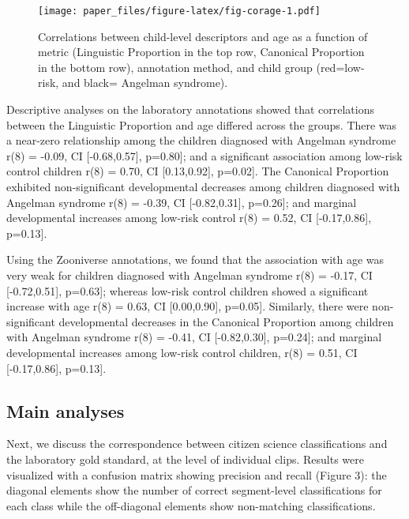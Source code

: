 \documentclass[english,,man]{apa6}
\begin{document}
\begin{figure}
\centering
\texttt{[image: paper\_files/figure-latex/fig-corage-1.pdf]}
\caption{\label{fig:fig-corage}Correlations between child-level descriptors and age as a function of metric (Linguistic Proportion in the top row, Canonical Proportion in the bottom row), annotation method, and child group (red=low-risk, and black= Angelman syndrome).}
\end{figure}

Descriptive analyses on the laboratory annotations showed that correlations between the Linguistic Proportion and age differed across the groups. There was a near-zero relationship among the children diagnosed with Angelman syndrome r(8) = -0.09, CI {[}-0.68,0.57{]}, p=0.80{]}; and a significant association among low-risk control children r(8) = 0.70, CI {[}0.13,0.92{]}, p=0.02{]}. The Canonical Proportion exhibited non-significant developmental decreases among children diagnosed with Angelman syndrome r(8) = -0.39, CI {[}-0.82,0.31{]}, p=0.26{]}; and marginal developmental increases among low-risk control r(8) = 0.52, CI {[}-0.17,0.86{]}, p=0.13{]}.

Using the Zooniverse annotations, we found that the association with age was very weak for children diagnosed with Angelman syndrome r(8) = -0.17, CI {[}-0.72,0.51{]}, p=0.63{]}; whereas low-risk control children showed a significant increase with age r(8) = 0.63, CI {[}0.00,0.90{]}, p=0.05{]}. Similarly, there were non-significant developmental decreases in the Canonical Proportion among children with Angelman syndrome r(8) = -0.41, CI {[}-0.82,0.30{]}, p=0.24{]}; and marginal developmental increases among low-risk control children, r(8) = 0.51, CI {[}-0.17,0.86{]}, p=0.13{]}.

\hypertarget{main-analyses}{%
\subsection{Main analyses}\label{main-analyses}}

Next, we discuss the correspondence between citizen science classifications and the laboratory gold standard, at the level of individual clips. Results were visualized with a confusion matrix showing precision and recall (Figure 3): the diagonal elements show the number of correct segment-level classifications for each class while the off-diagonal elements show non-matching classifications.
\end{document}
